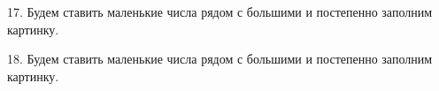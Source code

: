 \documentclass[12pt]{article}
\begin{document}
17. Будем ставить маленькие числа рядом с большими и постепенно заполним картинку.
\begin{center}
\begin{figure}[h!]
\end{figure}
\end{center}
18. Будем ставить маленькие числа рядом с большими и постепенно заполним картинку.
\begin{center}
\begin{figure}[h!]
\end{figure}
\end{center}
\end{document}

